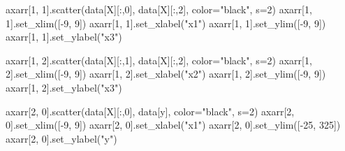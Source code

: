 \documentclass[
  letterpaper,
  DIV=11,
  numbers=noendperiod]{scrartcl}
\newenvironment{Shaded}{\begin{snugshade}}{\end{snugshade}}
\newcommand{\DecValTok}[1]{\textcolor[rgb]{0.68,0.00,0.00}{#1}}
\newcommand{\NormalTok}[1]{\textcolor[rgb]{0.00,0.23,0.31}{#1}}
\newcommand{\OperatorTok}[1]{\textcolor[rgb]{0.37,0.37,0.37}{#1}}
\newcommand{\StringTok}[1]{\textcolor[rgb]{0.13,0.47,0.30}{#1}}
\begin{document}
\begin{Shaded}
\begin{Highlighting}[]
\NormalTok{axarr[}\DecValTok{1}\NormalTok{, }\DecValTok{1}\NormalTok{].scatter(data[}\StringTok{\textquotesingle{}X\textquotesingle{}}\NormalTok{][:,}\DecValTok{0}\NormalTok{], data[}\StringTok{\textquotesingle{}X\textquotesingle{}}\NormalTok{][:,}\DecValTok{2}\NormalTok{], color}\OperatorTok{=}\StringTok{"black"}\NormalTok{, s}\OperatorTok{=}\DecValTok{2}\NormalTok{)}
\NormalTok{axarr[}\DecValTok{1}\NormalTok{, }\DecValTok{1}\NormalTok{].set\_xlim([}\OperatorTok{{-}}\DecValTok{9}\NormalTok{, }\DecValTok{9}\NormalTok{])}
\NormalTok{axarr[}\DecValTok{1}\NormalTok{, }\DecValTok{1}\NormalTok{].set\_xlabel(}\StringTok{"x1"}\NormalTok{)}
\NormalTok{axarr[}\DecValTok{1}\NormalTok{, }\DecValTok{1}\NormalTok{].set\_ylim([}\OperatorTok{{-}}\DecValTok{9}\NormalTok{, }\DecValTok{9}\NormalTok{])}
\NormalTok{axarr[}\DecValTok{1}\NormalTok{, }\DecValTok{1}\NormalTok{].set\_ylabel(}\StringTok{"x3"}\NormalTok{)}

\NormalTok{axarr[}\DecValTok{1}\NormalTok{, }\DecValTok{2}\NormalTok{].scatter(data[}\StringTok{\textquotesingle{}X\textquotesingle{}}\NormalTok{][:,}\DecValTok{1}\NormalTok{], data[}\StringTok{\textquotesingle{}X\textquotesingle{}}\NormalTok{][:,}\DecValTok{2}\NormalTok{], color}\OperatorTok{=}\StringTok{"black"}\NormalTok{, s}\OperatorTok{=}\DecValTok{2}\NormalTok{)}
\NormalTok{axarr[}\DecValTok{1}\NormalTok{, }\DecValTok{2}\NormalTok{].set\_xlim([}\OperatorTok{{-}}\DecValTok{9}\NormalTok{, }\DecValTok{9}\NormalTok{])}
\NormalTok{axarr[}\DecValTok{1}\NormalTok{, }\DecValTok{2}\NormalTok{].set\_xlabel(}\StringTok{"x2"}\NormalTok{)}
\NormalTok{axarr[}\DecValTok{1}\NormalTok{, }\DecValTok{2}\NormalTok{].set\_ylim([}\OperatorTok{{-}}\DecValTok{9}\NormalTok{, }\DecValTok{9}\NormalTok{])}
\NormalTok{axarr[}\DecValTok{1}\NormalTok{, }\DecValTok{2}\NormalTok{].set\_ylabel(}\StringTok{"x3"}\NormalTok{)}

\NormalTok{axarr[}\DecValTok{2}\NormalTok{, }\DecValTok{0}\NormalTok{].scatter(data[}\StringTok{\textquotesingle{}X\textquotesingle{}}\NormalTok{][:,}\DecValTok{0}\NormalTok{], data[}\StringTok{\textquotesingle{}y\textquotesingle{}}\NormalTok{], color}\OperatorTok{=}\StringTok{"black"}\NormalTok{, s}\OperatorTok{=}\DecValTok{2}\NormalTok{)}
\NormalTok{axarr[}\DecValTok{2}\NormalTok{, }\DecValTok{0}\NormalTok{].set\_xlim([}\OperatorTok{{-}}\DecValTok{9}\NormalTok{, }\DecValTok{9}\NormalTok{])}
\NormalTok{axarr[}\DecValTok{2}\NormalTok{, }\DecValTok{0}\NormalTok{].set\_xlabel(}\StringTok{"x1"}\NormalTok{)}
\NormalTok{axarr[}\DecValTok{2}\NormalTok{, }\DecValTok{0}\NormalTok{].set\_ylim([}\OperatorTok{{-}}\DecValTok{25}\NormalTok{, }\DecValTok{325}\NormalTok{])}
\NormalTok{axarr[}\DecValTok{2}\NormalTok{, }\DecValTok{0}\NormalTok{].set\_ylabel(}\StringTok{"y"}\NormalTok{)}


\end{Highlighting}
\end{Shaded}
\end{document}
